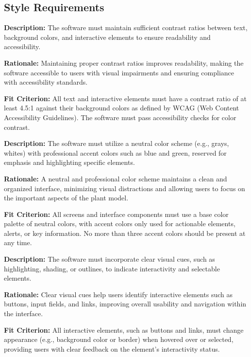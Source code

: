 \documentclass[12pt]{article}
\begin{document}
\subsection{Style Requirements}

\begin{tcolorbox}[title=LAFSR1]
  \textbf{Description:} The software must maintain sufficient contrast ratios between text, background colors, and interactive elements to ensure readability and accessibility.

  \textbf{Rationale:} Maintaining proper contrast ratios improves readability, making the software accessible to users with visual impairments and ensuring compliance with accessibility standards.

  \textbf{Fit Criterion:} All text and interactive elements must have a contrast ratio of at least 4.5:1 against their background colors as defined by WCAG (Web Content Accessibility Guidelines). The software must pass accessibility checks for color contrast.
\end{tcolorbox}
\vspace{0.5cm}
\begin{tcolorbox}[title=LAFSR2]
  \textbf{Description:} The software must utilize a neutral color scheme (e.g., grays, whites) with professional accent colors such as blue and green, reserved for emphasis and highlighting specific elements.

  \textbf{Rationale:} A neutral and professional color scheme maintains a clean and organized interface, minimizing visual distractions and allowing users to focus on the important aspects of the plant model.

  \textbf{Fit Criterion:} All screens and interface components must use a base color palette of neutral colors, with accent colors only used for actionable elements, alerts, or key information. No more than three accent colors should be present at any time.
\end{tcolorbox}

\vspace{0.5cm}

\begin{tcolorbox}[title=LAFSR3]
  \textbf{Description:} The software must incorporate clear visual cues, such as highlighting, shading, or outlines, to indicate interactivity and selectable elements.

  \textbf{Rationale:} Clear visual cues help users identify interactive elements such as buttons, input fields, and links, improving overall usability and navigation within the interface.

  \textbf{Fit Criterion:} All interactive elements, such as buttons and links, must change appearance (e.g., background color or border) when hovered over or selected, providing users with clear feedback on the element’s interactivity status.
\end{tcolorbox}
\end{document}
